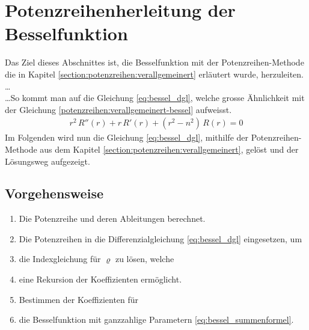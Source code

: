 %
%
%
%
%
\section{Potenzreihenherleitung der Besselfunktion}
Das Ziel dieses Abschnittes ist, die Besselfunktion mit der Potenzreihen-Methode die in Kapitel \ref{section:potenzreihen:verallgemeinert} erl\"autert wurde, herzuleiten.
\dots \\
%
\dots So kommt man auf die Gleichung \ref{eq:bessel_dgl}, welche grosse \"Ahnlichkeit mit der Gleichung \ref{potenzreihen:verallgemeinert-bessel} aufweisst.
\begin{align}
	r^2 \, R'' \left( r \right)
	+
	r \, R' \left( r \right)
	+
	\left( r^2 - n^2 \right) \, R \left( r \right)
	=
	0
	\label{eq:bessel_dgl}
\end{align}
Im Folgenden wird nun die Gleichung \ref{eq:bessel_dgl}, mithilfe der Potenzreihen-Methode aus dem Kapitel \ref{section:potenzreihen:verallgemeinert}, gel\"ost und der L\"osungsweg aufgezeigt.
\subsection*{Vorgehensweise}
\begin{enumerate}
	\item Die Potenzreihe und deren Ableitungen berechnet.
	\item Die Potenzreihen in die Differenzialgleichung \ref{eq:bessel_dgl} eingesetzen, um
	\item die Indexgleichung f\"ur $\varrho$ zu l\"osen, welche
	\item eine Rekursion der Koeffizienten erm\"oglicht.
	\item Bestimmen der Koeffizienten f\"ur
	\item die Besselfunktion mit ganzzahlige Parametern \ref{eq:bessel_summenformel}.
\end{enumerate}


